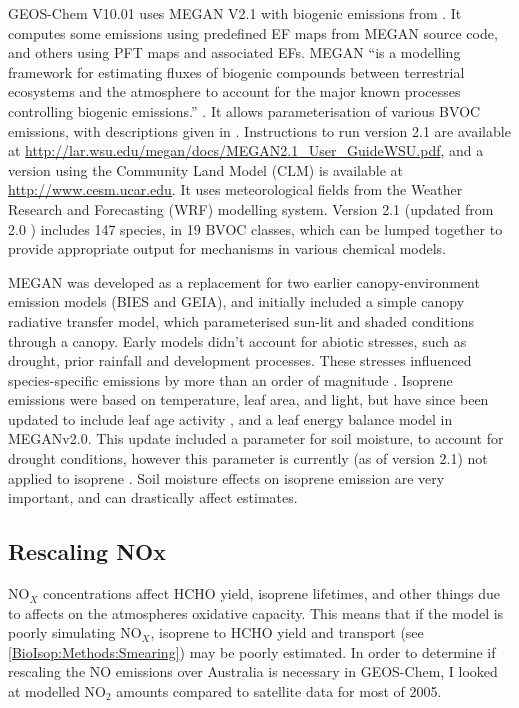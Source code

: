     GEOS-Chem V10.01 uses MEGAN V2.1 with biogenic emissions from \textcite{Guenther2012}.
    It computes some emissions using predefined EF maps from MEGAN source code, and others using PFT maps and associated EFs.
    MEGAN ``is a modelling framework for estimating fluxes of biogenic compounds between terrestrial ecosystems and the atmosphere to account for the major known processes controlling biogenic emissions.'' \parencite{Guenther2012}.
    It allows parameterisation of various BVOC emissions, with descriptions given in \textcite{Guenther2012}.
    Instructions to run version 2.1 are available at \url{http://lar.wsu.edu/megan/docs/MEGAN2.1_User_GuideWSU.pdf}, and a version using the Community Land Model (CLM) is available at \url{http://www.cesm.ucar.edu}.
    It uses meteorological fields from the Weather Research and Forecasting (WRF) modelling system.
    Version 2.1 (updated from 2.0 \parencite{Guenther2006}) includes 147 species, in 19 BVOC classes, which can be lumped together to provide appropriate output for mechanisms in various chemical models.
    
    MEGAN was developed as a replacement for two earlier canopy-environment emission models (BIES and GEIA), and initially included a simple canopy radiative transfer model, which parameterised sun-lit and shaded conditions through a canopy.
    Early models didn't account for abiotic stresses, such as drought, prior rainfall and development processes. These stresses influenced species-specific emissions by more than an order of magnitude \parencite{Niinemets1999}.
    Isoprene emissions were based on temperature, leaf area, and light, but have since been updated to include leaf age activity \parencite{Guenther2000}, and a leaf energy balance model \parencite{Guenther2006} in MEGANv2.0.
    This update included a parameter for soil moisture, to account for drought conditions, however this parameter is currently (as of version 2.1) not applied to isoprene \parencite{Sindelarova2014}.
    Soil moisture effects on isoprene emission are very important, and can drastically affect estimates.
  
  \subsection{Rescaling NOx}
  
    NO$_X$ concentrations affect HCHO yield, isoprene lifetimes, and other things due to affects on the atmospheres oxidative capacity.
    This means that if the model is poorly simulating NO$_X$, isoprene to HCHO yield and transport (see \ref{BioIsop:Methods:Smearing}) may be poorly estimated.
    In order to determine if rescaling the NO emissions over Australia is necessary in GEOS-Chem, I looked at modelled NO$_2$ amounts compared to satellite data for most of 2005.
    
